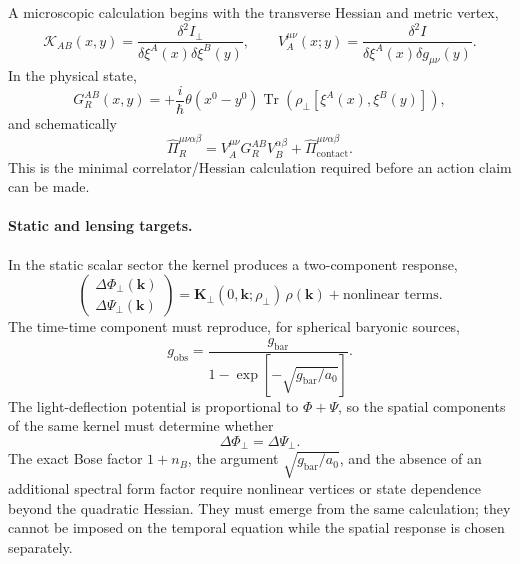 \documentclass[11pt]{article}
\begin{document}
A microscopic calculation begins with the transverse Hessian and metric vertex,
\[
\mathcal K_{AB}(x,y)
=\frac{\delta^2 I_{\perp}}
{\delta\xi^A(x)\delta\xi^B(y)},
\qquad
V_A^{\mu\nu}(x;y)
=\frac{\delta^2 I}
{\delta\xi^A(x)\delta g_{\mu\nu}(y)}.
\]
In the physical state,
\[
G_{R}^{AB}(x,y)
=+\frac{i}{\hbar}\theta(x^0-y^0)
\operatorname{Tr}\!\left(
\rho_\perp[\xi^A(x),\xi^B(y)]
\right),
\]
and schematically
\[
\widehat\Pi_R^{\mu\nu\alpha\beta}
=V_A^{\mu\nu}G_R^{AB}V_B^{\alpha\beta}
+\widehat\Pi_{\mathrm{contact}}^{\mu\nu\alpha\beta}.
\]
This is the minimal correlator/Hessian calculation required before an action claim can be made.

\paragraph{Static and lensing targets.}
In the static scalar sector the kernel produces a two-component response,
\[
\begin{pmatrix}
\Delta\Phi_\perp(\mathbf k)\\
\Delta\Psi_\perp(\mathbf k)
\end{pmatrix}
=
\mathbf K_\perp(0,\mathbf k;\rho_\perp)\,
\rho(\mathbf k)
+\text{nonlinear terms}.
\]
The time-time component must reproduce, for spherical baryonic sources,
\[
g_{\mathrm{obs}}
=\frac{g_{\mathrm{bar}}}
{1-\exp[-\sqrt{g_{\mathrm{bar}}/a_0}]}.
\]
The light-deflection potential is proportional to $\Phi+\Psi$, so the spatial components of the same kernel must determine whether
\[
\Delta\Phi_\perp=\Delta\Psi_\perp.
\]
The exact Bose factor $1+n_B$, the argument $\sqrt{g_{\mathrm{bar}}/a_0}$, and the absence of an additional spectral form factor require nonlinear vertices or state dependence beyond the quadratic Hessian. They must emerge from the same calculation; they cannot be imposed on the temporal equation while the spatial response is chosen separately.
\end{document}
